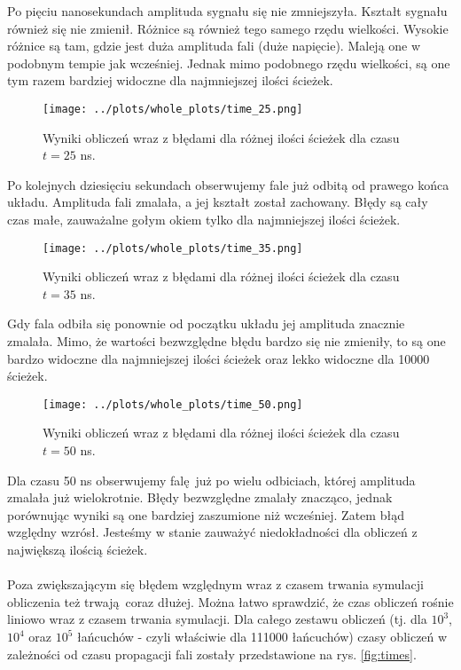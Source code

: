 \documentclass[a4paper, 12pt]{article}
\begin{document}
	\noindent Po pięciu nanosekundach amplituda sygnału się nie zmniejszyła. 
	Kształt sygnału również się nie zmienił.
	Różnice są również tego samego rzędu wielkości.
	Wysokie różnice są tam, gdzie jest duża amplituda fali (duże napięcie).
	Maleją one w podobnym tempie jak wcześniej.
	Jednak mimo podobnego rzędu wielkości, są one tym razem bardziej widoczne dla najmniejszej ilości ścieżek.
	

	\begin{figure}[H]
		\centering
		\texttt{[image: ../plots/whole\_plots/time\_25.png]}
		\caption{Wyniki obliczeń wraz z błędami dla różnej ilości ścieżek dla czasu $t = 25$ ns.}
		\label{fig:25}
	\end{figure}
	
	\noaka Po kolejnych dziesięciu sekundach obserwujemy fale już odbitą od prawego końca układu.
	Amplituda fali zmalała, a jej kształt został zachowany. 
	Błędy są cały czas małe, zauważalne gołym okiem tylko dla najmniejszej ilości ścieżek.
	
	\begin{figure}[H]
		\centering
		\texttt{[image: ../plots/whole\_plots/time\_35.png]}
		\caption{Wyniki obliczeń wraz z błędami dla różnej ilości ścieżek dla czasu $t = 35$ ns.}
		\label{fig:35}
	\end{figure}
	
	\noindent Gdy fala odbiła się ponownie od początku układu jej amplituda znacznie zmalała.
	Mimo, że wartości bezwzględne błędu bardzo się nie zmieniły, to są one bardzo widoczne dla najmniejszej ilości ścieżek oraz lekko widoczne dla 10000 ścieżek.
	
	\begin{figure}[H]
		\centering
		\texttt{[image: ../plots/whole\_plots/time\_50.png]}
		\caption{Wyniki obliczeń wraz z błędami dla różnej ilości ścieżek dla czasu $t = 50$ ns.}
		\label{fig:50}
	\end{figure}
	
	\noindent Dla czasu 50 ns obserwujemy falę już po wielu odbiciach, której amplituda zmalała już wielokrotnie. 
	Błędy bezwzględne zmalały znacząco, jednak porównując wyniki są one bardziej zaszumione niż wcześniej.
	Zatem błąd względny wzrósł. 
	Jesteśmy w stanie zauważyć niedokładności dla obliczeń z największą ilością ścieżek.
	\\
	\\
	Poza zwiększającym się błędem względnym wraz z czasem trwania symulacji obliczenia też trwają coraz dłużej.
	Można łatwo sprawdzić, że czas obliczeń rośnie liniowo wraz z czasem trwania symulacji.
	Dla całego zestawu obliczeń (tj. dla $10^3$, $10^4$ oraz $10^5$ łańcuchów - czyli właściwie dla 111000 łańcuchów) czasy obliczeń w zależności od czasu propagacji fali zostały przedstawione na rys. \ref{fig:times}.
	
\end{document}
